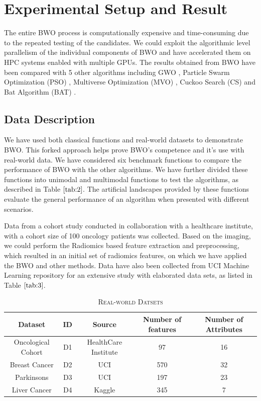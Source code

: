\documentclass[conference]{IEEEtran}
\theoremstyle{definition}
\begin{document}
\section{Experimental Setup and Result}

The entire BWO process is computationally expensive and time-consuming due to the repeated testing of the candidates. We could exploit the algorithmic level parallelism of the individual components of BWO and have accelerated them on HPC systems enabled with multiple GPUs. The results obtained from BWO have been compared with 5 other algorithms including GWO \cite{gwo}, Particle Swarm Optimization (PSO) \cite{pso}, Multiverse Optimization (MVO) \cite{mvo}, Cuckoo Search (CS) \cite{cs} and Bat Algorithm (BAT) \cite{bat}. 

\subsection{Data Description}

We have used both classical functions and real-world datasets to demonstrate BWO. This forked approach helps prove BWO's competence and it's use with real-world data. We have considered six benchmark functions to compare the performance of BWO with the other algorithms. We have further divided these functions into unimodal and multimodal functions to test the algorithms, as described in Table $\ref{tab:2}$. The artificial landscapes provided by these functions evaluate the general performance of an algorithm when presented with different scenarios. 

Data from a cohort study conducted in collaboration with a healthcare institute, with a cohort size of 100 oncology patients was collected. Based on the imaging, we could perform the Radiomics based feature extraction and preprocessing, which resulted in an initial set of radiomics features, on which we have applied the BWO and other methods. Data have also been collected from UCI Machine Learning repository for an extensive study with elaborated data sets, as listed in Table $\ref{tab:3}$. 

\begin{table}[t]
\caption{\textsc{Real-world Datsets}}
\label{tab:3}
\centering
\scalebox{0.75}
{
\begin{tabular}{ | c | c | c | c | c |}
\hline  
Dataset & ID & Source & Number of features & Number of Attributes\\
\hline
Oncological Cohort & D1 & HealthCare Institute& 97 & 16\\
Breast Cancer & D2 & UCI & 570 & 32\\
Parkinsons & D3 & UCI & 197 & 23\\
Liver Cancer& D4 & Kaggle & 345 & 7\\
\hline
\end{tabular}
}
\end{table}
\end{document}
